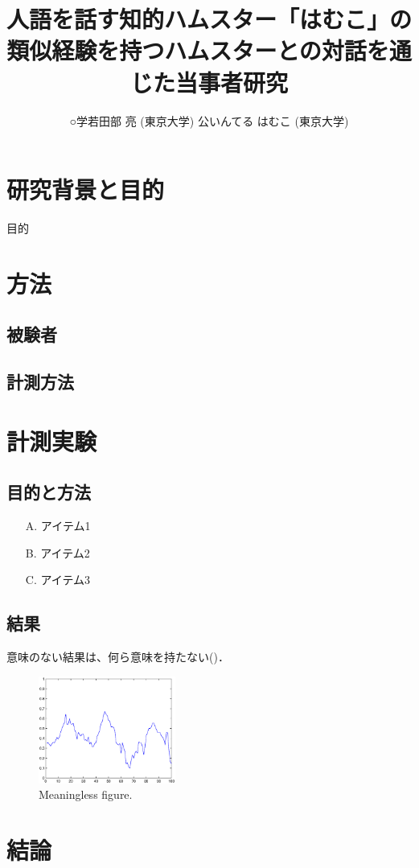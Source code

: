 \documentclass[10pt,a4paper]{jsarticle}
\title{人語を話す知的ハムスター「はむこ」の \\
類似経験を持つハムスターとの対話を通じた当事者研究}
\author{
○学\hspace{1zw}若田部 亮 (東京大学)\hspace{2zw}
公\hspace{1zw}いんてる はむこ (東京大学)}
\begin{document}
\setlength{\baselineskip}{4.685truemm}%
\maketitle
\thispagestyle{empty}

\section{研究背景と目的}

目的 \cite{Cornwell1975175, 110002427721}


\section{方法}
\subsection{被験者}
\subsection{計測方法}

\section{計測実験}
\subsection{目的と方法}

\begin{itemize}
    \item[A.] アイテム1
    \item[B.] アイテム2
    \item[C.] アイテム3
\end{itemize}

\subsection{結果}
意味のない結果は、何ら意味を持たない()．

\begin{figure}[t!]
 \centering
  \includegraphics[width=0.40\textwidth]{figure/sample.eps}
 \caption{Meaningless figure.}
 \label{fig:meaningless}
\end{figure}


\section{結論}


\begin{footnotesize}

%

\end{footnotesize}
\end{document}
